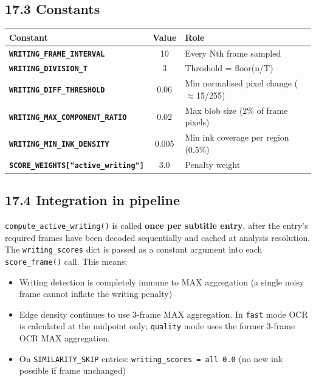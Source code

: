 \documentclass[11pt]{article}
\begin{document}
\subsection*{17.3 Constants}
\begin{tabularx}{\textwidth}{>{\bfseries}l c X}
Constant & Value & Role \\
\midrule
\texttt{WRITING\_FRAME\_INTERVAL} & 10 & Every Nth frame sampled \\
\texttt{WRITING\_DIVISION\_T} & 3 & Threshold = floor(n/T) \\
\texttt{WRITING\_DIFF\_THRESHOLD} & 0.06 & Min normalised pixel change ($\approx$15/255) \\
\texttt{WRITING\_MAX\_COMPONENT\_RATIO} & 0.02 & Max blob size (2\% of frame pixels) \\
\texttt{WRITING\_MIN\_INK\_DENSITY} & 0.005 & Min ink coverage per region (0.5\%) \\
\texttt{SCORE\_WEIGHTS["active\_writing"]} & 3.0 & Penalty weight \\
\end{tabularx}

\subsection*{17.4 Integration in pipeline}
\texttt{compute\_active\_writing()} is called \textbf{once per subtitle entry}, after the entry's required frames have been decoded sequentially and cached at analysis resolution. The \texttt{writing\_scores} dict is passed as a constant argument into each \texttt{score\_frame()} call. This means:
\begin{itemize}[leftmargin=1.2em]
    \item Writing detection is completely immune to MAX aggregation (a single noisy frame cannot inflate the writing penalty)
    \item Edge density continues to use 3-frame MAX aggregation. In \texttt{fast} mode OCR is calculated at the midpoint only; \texttt{quality} mode uses the former 3-frame OCR MAX aggregation.
    \item On \texttt{SIMILARITY\_SKIP} entries: \texttt{writing\_scores = all 0.0} (no new ink possible if frame unchanged)
\end{itemize}
\end{document}
